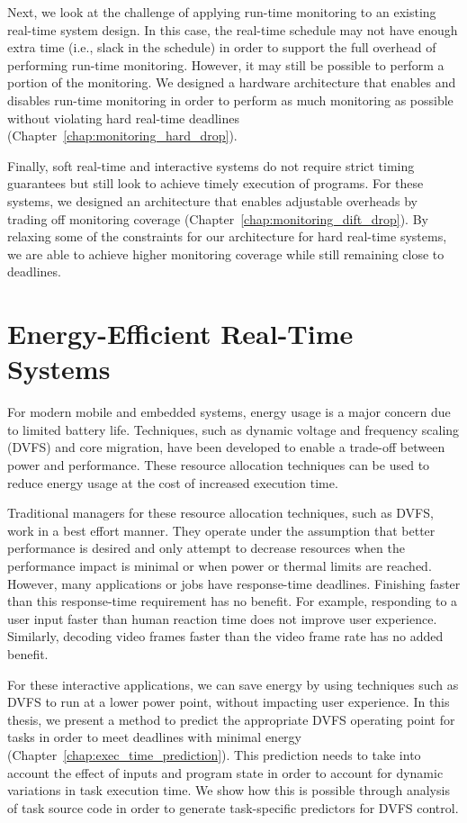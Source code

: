 Next, we look at the challenge of applying run-time monitoring to an existing
real-time system design. In this case, the real-time schedule may not have
enough extra time (i.e., slack in the schedule) in order to support the
full overhead of performing run-time monitoring. However, it may still be possible
to perform a portion of the monitoring. We designed a hardware architecture
that enables and disables run-time monitoring in order to perform as much
monitoring as possible without violating hard real-time deadlines
(Chapter~\ref{chap:monitoring_hard_drop}).

Finally, soft real-time and interactive systems do not require strict timing guarantees
but still look to achieve timely execution of programs. For these systems, we designed an
architecture that enables adjustable overheads by trading off monitoring coverage
(Chapter~\ref{chap:monitoring_dift_drop}). By relaxing some of the constraints
for our architecture for hard real-time systems, we are able to achieve higher
monitoring coverage while still remaining close to deadlines.

\section{Energy-Efficient Real-Time Systems}
\label{sec:intro.energy}

For modern mobile and embedded systems, energy usage is a major concern due to
limited battery life. Techniques, such as dynamic voltage and frequency scaling
(DVFS) and core migration, have been developed to enable a trade-off
between power and performance. These resource allocation techniques can be used
to reduce energy usage at the cost of increased execution time.

Traditional managers for these resource allocation techniques, such as DVFS,
work in a best effort manner. They operate under the assumption that better
performance is desired and only attempt to decrease resources when the
performance impact is minimal or when power or thermal limits are reached.
However, many applications or jobs have
response-time deadlines. Finishing faster than this response-time
requirement has no benefit. For example, responding to a user input faster than
human reaction time does not improve user experience. Similarly, decoding video
frames faster than the video frame rate has no added benefit. 

For these interactive applications, we can save energy by using techniques such
as DVFS to run at a lower power point, without impacting user experience.  In
this thesis, we present a
method to predict the appropriate DVFS operating point for tasks in order to
meet deadlines with minimal energy (Chapter~\ref{chap:exec_time_prediction}).
This prediction needs to take into account the effect of inputs and program
state in order to account for dynamic variations in task execution time. We
show how this is possible through analysis of task source code in order
to generate task-specific predictors for DVFS control.


